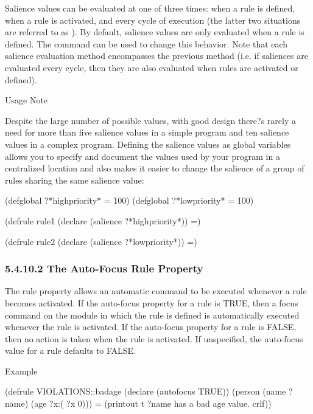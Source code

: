 \documentclass[letterpaper,10pt,english]{sphinxmanual}
\begin{document}
Salience values can be evaluated at one of three times: when a rule is
defined, when a rule is activated, and every cycle of execution (the
latter two situations are referred to as ). By
default, salience values are only evaluated when a rule is defined. The
 command can be used to change this behavior.
Note that each salience evaluation method encompasses the previous
method (i.e. if saliences are evaluated every cycle, then they are also
evaluated when rules are activated or defined).

Usage Note

Despite the large number of possible values, with good design there?s
rarely a need for more than five salience values in a simple program and
ten salience values in a complex program. Defining the salience values
as global variables allows you to specify and document the values used
by your program in a centralized location and also makes it easier to
change the salience of a group of rules sharing the same salience value:

\begin{sphinxVerbatim}[commandchars=\\\{\}]
(defglobal ?*high\PYGZhy{}priority* = 100)
(defglobal ?*low\PYGZhy{}priority* = \PYGZhy{}100)

(defrule rule\PYGZhy{}1
  (declare (salience ?*high\PYGZhy{}priority*))
  =\PYGZgt{})

(defrule rule\PYGZhy{}2
  (declare (salience ?*low\PYGZhy{}priority*))
  =\PYGZgt{})
\end{sphinxVerbatim}


\subsubsection{5.4.10.2 The Auto-Focus Rule Property}
\label{\detokenize{defrule:the-auto-focus-rule-property}}
The  rule property allows an automatic  command
to be executed whenever a rule becomes activated. If the auto-focus
property for a rule is TRUE, then a focus command on the module in which
the rule is defined is automatically executed whenever the rule is
activated. If the auto-focus property for a rule is FALSE, then no
action is taken when the rule is activated. If unspecified, the
auto-focus value for a rule defaults to FALSE.

Example

\begin{sphinxVerbatim}[commandchars=\\\{\}]
(defrule VIOLATIONS::bad\PYGZhy{}age
  (declare (auto\PYGZhy{}focus TRUE))
  (person (name ?name) (age ?x\PYGZam{}:(\PYGZlt{} ?x 0)))
  =\PYGZgt{}
  (printout t ?name \PYGZdq{} has a bad age value.\PYGZdq{} crlf))
\end{sphinxVerbatim}
\label{\detokenize{defrule:section-3}}
\end{document}
